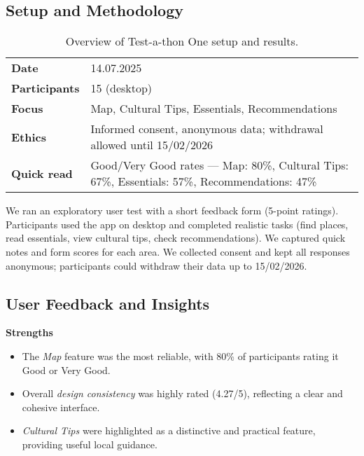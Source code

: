 \subsection{Setup and Methodology}
\begin{table}[h!]
\centering
\small
\begin{tabular}{p{3cm}p{10cm}}
\hline
\textbf{Date} & 14.07.2025 \\
\textbf{Participants} & 15 (desktop) \\
\textbf{Focus} & Map, Cultural Tips, Essentials, Recommendations \\
\textbf{Ethics} & \raggedright Informed consent, anonymous data; withdrawal allowed until 15/02/2026 \\
\textbf{Quick read} & Good/Very Good rates — Map: 80\%, Cultural Tips: 67\%, Essentials: 57\%, Recommendations: 47\% \\
\hline
\end{tabular}
\caption{Overview of Test-a-thon One setup and results.}
\label{tab:testathon1-overview}
\end{table}



\noindent We ran an exploratory user test with a short feedback form (5-point ratings).
Participants used the app on desktop and completed realistic tasks (find places, read essentials, view cultural tips, check recommendations). We captured quick notes and form scores for each area. 
We collected consent and kept all responses anonymous; participants could withdraw their data up to 15/02/2026. 

\subsection{User Feedback and Insights}

\textbf{Strengths}
\begin{itemize}\setlength\itemsep{0.3em}
    \item The \emph{Map} feature was the most reliable, with 80\% of participants rating it Good or Very Good. 
    \item Overall \emph{design consistency} was highly rated (4.27/5), reflecting a clear and cohesive interface. 
    \item \emph{Cultural Tips} were highlighted as a distinctive and practical feature, providing useful local guidance. 
\end{itemize}

